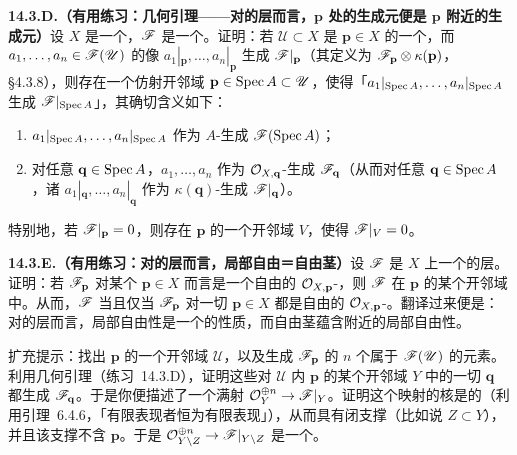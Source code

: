 \textbf{14.3.D.（有用练习：几何\trNakayama{}引理——对\trFiniteType{}的层而言，$\mathbf{p}$ 处的生成元便是 $\mathbf{p}$ 附近的生成元）}\quad 设 $X$ 是一个\trScheme，$\mathscr{F}$ 是一个\trFiniteType{}\trQCSheaf。证明：若 $\mathscr{U}\subset X$ 是 $\mathbf{p}\in X$ 的一个\trOpen\trNeighborhood，而 $a_1,\dots,a_n\in\mathscr{F}(\mathscr{U})$ 的像 $a_1|_{\mathbf{p}},\dots,a_n|_{\mathbf{p}}$ 生成\trFiber{} $\mathscr{F}|_{\mathbf{p}}$（其定义为 $\mathscr{F}_{\mathbf{p}}\otimes\kappa(\mathbf{p})$，\S4.3.8），则存在一个仿射开邻域 $\mathbf{p}\in\operatorname{Spec} A\subset\mathscr{U}$，使得「$a_1|_{\operatorname{Spec} A},\dots,a_n|_{\operatorname{Spec} A}$ 生成 $\mathscr{F}|_{\operatorname{Spec} A}$」，其确切含义如下：
\begin{enumerate}[label=(\roman*)]
\item $a_1|_{\operatorname{Spec} A},\dots,a_n|_{\operatorname{Spec} A}$ 作为 $A$-\trModule{}生成 $\mathscr{F}(\operatorname{Spec} A)$；
\item 对任意 $\mathbf{q}\in\operatorname{Spec} A$，$a_1,\dots,a_n$ 作为 $\mathcal{O}_{X,\mathbf{q}}$-\trModule{}生成\trStalk{} $\mathscr{F}_{\mathbf{q}}$（从而对任意 $\mathbf{q}\in\operatorname{Spec} A$，诸\trFiber{} $a_1|_{\mathbf{q}},\dots,a_n|_{\mathbf{q}}$ 作为 $\kappa(\mathbf{q})$-\trVectorSpace{}生成\trFiber{} $\mathscr{F}|_{\mathbf{q}}$）。
\end{enumerate}
特别地，若 $\mathscr{F}|_{\mathbf{p}}=0$，则存在 $\mathbf{p}$ 的一个开邻域 $V$，使得 $\mathscr{F}|_V=0$。

\textbf{14.3.E.（有用练习：对\trFinitelyPresented{}的层而言，局部自由＝自由茎）}\quad 设 $\mathscr{F}$ 是\trScheme{} $X$ 上一个\trFinitelyPresented{}的层。证明：若 $\mathscr{F}_{\mathbf{p}}$ 对某个 $\mathbf{p}\in X$ 而言是一个自由的 $\mathcal{O}_{X,\mathbf{p}}$-\trModule，则 $\mathscr{F}$ 在 $\mathbf{p}$ 的某个开邻域中\trLocallyFree。从而，$\mathscr{F}$ \trLocallyFree{}当且仅当 $\mathscr{F}_{\mathbf{p}}$ 对一切 $\mathbf{p}\in X$ 都是自由的 $\mathcal{O}_{X,\mathbf{p}}$-\trModule。翻译过来便是：对\trFinitelyPresented{}的层而言，局部自由性是一个\trStalkLocal{}的性质，而自由茎蕴含附近的局部自由性。

扩充提示：找出 $\mathbf{p}$ 的一个开邻域 $\mathscr{U}$，以及生成 $\mathscr{F}_{\mathbf{p}}$ 的 $n$ 个属于 $\mathscr{F}(\mathscr{U})$ 的元素。利用几何\trNakayama{}引理（\mbox{练习~14.3.D}），证明这些\trSection{}对 $\mathscr{U}$ 内 $\mathbf{p}$ 的某个开邻域 $Y$ 中的一切 $\mathbf{q}$ 都生成 $\mathscr{F}_{\mathbf{q}}$。于是你便描述了一个满射 $\mathcal{O}_Y^{\oplus n}\to\mathscr{F}|_Y$。证明这个映射的核是\trFiniteType{}的（利用引理~6.4.6，「有限表现者恒为有限表现」），从而具有闭支撑（比如说 $Z\subset Y$），并且该支撑不含 $\mathbf{p}$。于是 $\mathcal{O}_{Y\setminus Z}^{\oplus n}\to\mathscr{F}|_{Y\setminus Z}$ 是一个\trIsomorphism。

